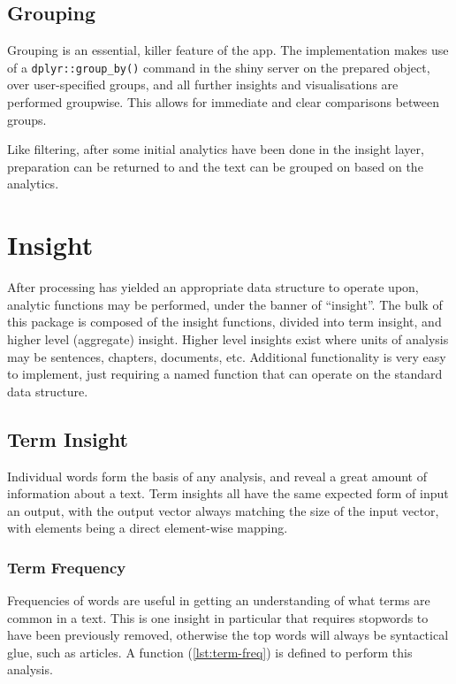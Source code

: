 \documentclass[11pt, a4paper, twoside, titlepage]{report}
\begin{document}
\subsection{Grouping}

Grouping is an essential, killer feature of the app. The
implementation makes use of a \texttt{dplyr::group_by()}
command in the shiny server on the prepared object, over
user-specified groups, and all further insights and visualisations are
performed groupwise. This allows for immediate and clear comparisons
between groups.

Like filtering, after some initial analytics have been done in the
insight layer, preparation can be returned to and the text can be
grouped on based on the analytics.

\section{Insight}\label{sec:insight}

After processing has yielded an appropriate data structure to operate
upon, analytic functions may be performed, under the banner of
``insight''. The bulk of this package is composed of the insight
functions, divided into term insight, and higher level (aggregate)
insight. Higher level insights exist where units of analysis may be
sentences, chapters, documents, etc. Additional functionality is very
easy to implement, just requiring a named function that can operate on
the standard data structure.

\subsection{Term Insight}\label{sec:term-insight}

Individual words form the basis of any analysis, and reveal a great
amount of information about a text. Term insights all have the same
expected form of input an output, with the output vector always
matching the size of the input vector, with elements being a direct
element-wise mapping.

\subsubsection{Term Frequency}\label{sec:term-frequency}

Frequencies of words are useful in getting an understanding of what
terms are common in a text. This is one insight in particular that
requires stopwords to have been previously removed, otherwise the top
words will always be syntactical glue, such as articles. A function
(\cref{lst:term-freq}) is defined to perform this analysis.
\end{document}

